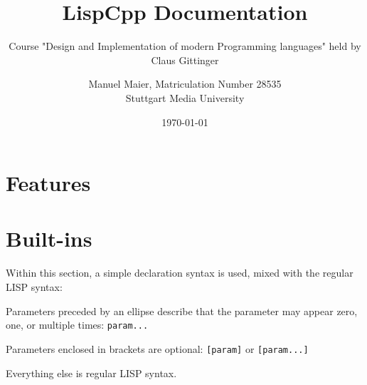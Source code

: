 \documentclass[a4paper]{scrartcl}
\title{LispCpp Documentation}
\subtitle{Course "Design and Implementation of modern Programming languages" held by Claus Gittinger}
\author{Manuel Maier, Matriculation Number 28535\\
		Stuttgart Media University}
\date{\today}
\begin{document}
\maketitle
\tableofcontents
\clearpage

\section{Features}
	
\section{Built-ins}
	Within this section, a simple declaration syntax is used, mixed with the regular LISP syntax:

	Parameters preceded by an ellipse describe that the parameter may appear zero, one, or multiple times: \lstinline|param...|

	Parameters enclosed in brackets are optional: \lstinline|[param]| or \lstinline|[param...]|

	Everything else is regular LISP syntax.

	

	
	
\end{document}
